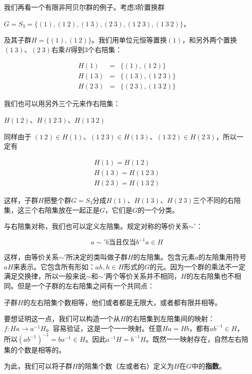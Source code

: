 \documentclass{article}
\begin{document}
我们再看一个有限非阿贝尔群的例子。考虑3阶置换群

$G = S_3 = \{(1), (1\ 2), (1\ 3), (2\ 3), (1\ 2\ 3), (1\ 3\ 2)\}$，

及其子群$H = \{(1), (1\ 2)\}$。我们用单位元恒等置换$(1)$，和另外两个置换$(1\ 3)$、$(2\ 3)$右乘$H$得到3个右陪集：

\[
\begin{array}{rcl}
H(1) & = & \{(1), (1\ 2)\} \\
H(1\ 3) & = & \{(1\ 3), (1\ 2\ 3)\} \\
H(2\ 3) & = & \{(2\ 3), (1\ 3\ 2)\}
\end{array}
\]

我们也可以用另外三个元来作右陪集：

$H(1\ 2)$、$H(1\ 2\ 3)$、$H(1\ 3\ 2)$

同样由于
$(1\ 2) \in H(1)$、$(1\ 2\ 3) \in H(1\ 3)$、$(1\ 3\ 2) \in H(2\ 3)$，所以一定有

\[
\begin{array}{l}
H(1) = H(1\ 2) \\
H(1\ 3) = H(1\ 2\ 3) \\
H(2\ 3) = H(1\ 3\ 2)
\end{array}
\]

这样，子群$H$把整个群$G = S_3$分成$H(1)$、$H(1\ 3)$、$H(2\ 3)$三个不同的右陪集，这三个右陪集放在一起正是$G$，它们是$G$的一个分类。

与右陪集对称，我们也可以定义左陪集。规定对称的等价关系$\sim'$：

\[
a \sim' b \text{当且仅当} b^{-1}a \in H
\]

这样，由等价关系$\sim'$所决定的类叫做子群$H$的左陪集。包含元素$a$的左陪集用符号$aH$来表示。它包含所有形如：$ah, h \in H$形式的$G$的元。因为一个群的乘法不一定满足交换律，所以一般来说$\sim$和$\sim'$两个等价关系并不相同，$H$的左右陪集也不相同。但是一个子群的左右陪集之间有一个共同点：

\begin{theorem}
子群$H$的左右陪集个数相等，他们或者都是无限大，或者都有限并相等。
\end{theorem}

要想证明这一点，我们可以构造一个从$H$的右陪集到左陪集间的映射：$f: Ha \to a^{-1}H$。容易验证，这是一个一一映射。任意$Ha = Hb$，都有$ab^{-1} \in H$，所以$(ab^{-1})^{-1} = ba^{-1} \in H$。因此$a^{-1}H= b^{-1}H$。既然一一映射存在，自然左右陪集的个数是相等的。

为此，我们可以将子群$H$的陪集个数（左或者右）定义为$H$在$G$中的\textbf{指数}。
\end{document}
